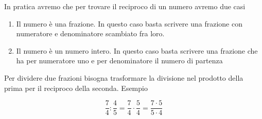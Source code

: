 In pratica  avremo che per trovare il reciproco di un numero avremo due casi
\begin{enumerate}
	\item Il numero è una frazione. In questo caso basta scrivere una frazione con numeratore e denominatore scambiato fra loro.
	\item Il numero è un numero intero. In questo caso basta scrivere una frazione che ha per numeratore uno e per denominatore il numero di partenza 
\end{enumerate}

Per dividere due frazioni bisogna trasformare la divisione nel prodotto della prima per il reciproco della seconda. Esempio

\[\dfrac{7}{4}:\dfrac{4}{5}=\dfrac{7}{4}\cdot\dfrac{5}{4}=\dfrac{7\cdot 5}{5\cdot 4}\]


